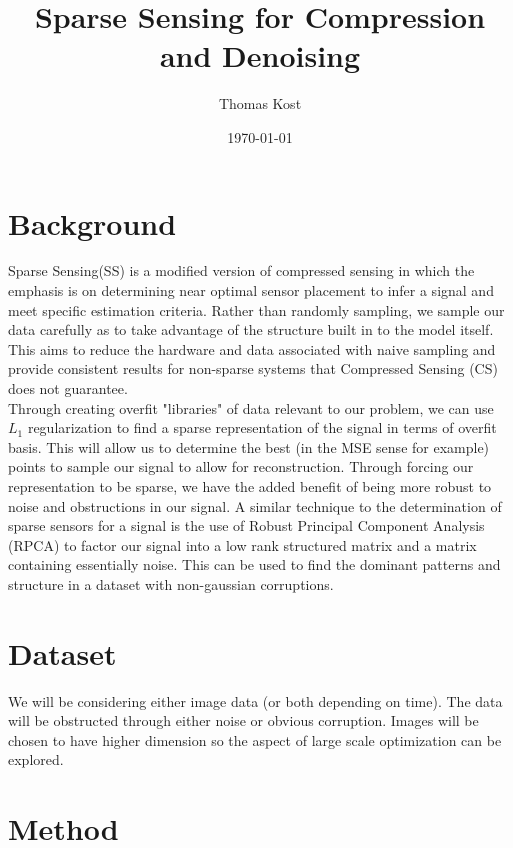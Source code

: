 \documentclass[12pt, letterpaper]{article}
\begin{document}
	\title{\vspace{-1in} Sparse Sensing for Compression and Denoising} %
	\author{Thomas Kost}
	\date{\today}
	\maketitle
	\section{Background}
		Sparse Sensing(SS) is a modified version of compressed sensing in which the emphasis is on determining near optimal sensor placement to infer a signal and meet specific estimation criteria. Rather than randomly sampling, we sample our data carefully as to take advantage of the structure built in to the model itself. This aims to reduce the hardware and data associated with naive sampling and provide consistent results for non-sparse systems that Compressed Sensing (CS) does not guarantee. \\
		
		Through creating overfit "libraries" of data relevant to our problem, we can use $L_{1}$ regularization to find a sparse representation of the signal in terms of overfit basis. This will allow us to determine the best (in the MSE sense for example) points to sample our signal to allow for reconstruction. Through forcing our representation to be sparse, we have the added benefit of being more robust to noise and obstructions in our signal. A similar technique to the determination of sparse sensors for a signal is the use of Robust Principal Component Analysis (RPCA) to factor our signal into a low rank structured matrix and a matrix containing essentially noise. This can be used to find the dominant patterns and structure in a dataset with non-gaussian corruptions. 
		
	\section{Dataset}
		We will be considering either image data (or both depending on time). The data will be obstructed through either noise or obvious corruption. Images will be chosen to have higher dimension so the aspect of large scale optimization can be explored.
		
	\section{Method}
	
\end{document}

